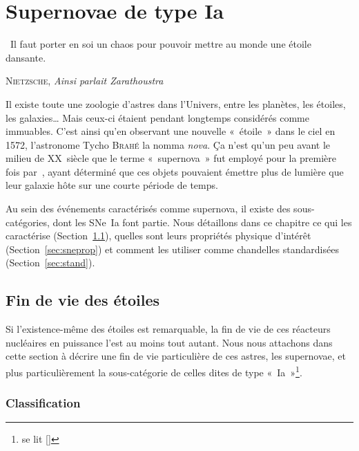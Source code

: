 \documentclass[../main/main.tex]{subfiles}
\begin{document}
\raggedbottom


\chapter{Supernovae de type Ia}\label{ch:sne}

\epigraph{\openquote\ Il faut porter en soi un chaos pour pouvoir mettre
au monde une étoile dansante.\closequote}{\textsc{Nietzsche}, \textit{Ainsi
parlait Zarathoustra}}

Il existe toute une zoologie d'astres dans l'Univers, entre les planètes, les
étoiles, les galaxies… Mais ceux-ci étaient pendant longtemps considérés comme
immuables. C'est ainsi qu'en observant une nouvelle «~étoile~» dans le ciel en
1572, l'astronome Tycho \textsc{Brahé} la nomma \textit{nova}. Ça n'est qu'un
peu avant le milieu de XX\ieme~siècle que le terme «~supernova~» fut employé
pour la première fois par~\cite{baade1934}, ayant déterminé que ces objets
pouvaient émettre plus de lumière que leur galaxie hôte sur une courte période
de temps.

Au sein des événements caractérisés comme supernova, il existe des
sous-catégories, dont les SNe~Ia font partie. Nous détaillons dans ce chapitre
ce qui les caractérise (Section~\ref{sec:death}), quelles sont leurs propriétés
physique d'intérêt (Section~\ref{sec:sneprop}) et comment les utiliser comme
chandelles standardisées (Section~\ref{sec:stand}).

\vfill
\minitoc
\vfill
\newpage

\section{Fin de vie des étoiles}\label{sec:death}

Si l'existence-même des étoiles est remarquable, la fin de vie de ces
réacteurs nucléaires en puissance l'est au moins tout autant. Nous nous
attachons dans cette section à décrire une fin de vie particulière de ces
astres, les supernovae, et plus particulièrement la sous-catégorie de celles
dites de type «~Ia~»\footnote{se lit []}.

\subsection{Classification}\label{ssec:class} %
\end{document}
